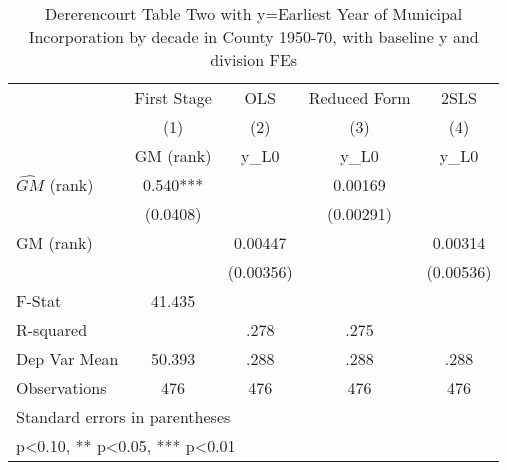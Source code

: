 \begin{table}[htbp]\centering
\def\sym#1{\ifmmode^{#1}\else\(^{#1}\)\fi}
\caption{Dererencourt Table Two with y=Earliest Year of Municipal Incorporation by decade in County 1950-70, with baseline y and division FEs}
\begin{tabular}{l*{4}{c}}
\toprule
                    & First Stage   &         OLS   &Reduced Form   &        2SLS   \\
                    &\multicolumn{1}{c}{(1)}&\multicolumn{1}{c}{(2)}&\multicolumn{1}{c}{(3)}&\multicolumn{1}{c}{(4)}\\
                    &\multicolumn{1}{c}{GM  (rank)}&\multicolumn{1}{c}{y\_L0}&\multicolumn{1}{c}{y\_L0}&\multicolumn{1}{c}{y\_L0}\\
\midrule
$\hat{GM}$ (rank)   &       0.540***&               &     0.00169   &               \\
                    &    (0.0408)   &               &   (0.00291)   &               \\
\addlinespace
GM  (rank)          &               &     0.00447   &               &     0.00314   \\
                    &               &   (0.00356)   &               &   (0.00536)   \\
\midrule
F-Stat              &      41.435   &               &               &               \\
R-squared           &               &        .278   &        .275   &               \\
Dep Var Mean        &      50.393   &        .288   &        .288   &        .288   \\
Observations        &         476   &         476   &         476   &         476   \\
\bottomrule
\multicolumn{5}{l}{\footnotesize Standard errors in parentheses}\\
\multicolumn{5}{l}{\footnotesize * p<0.10, ** p<0.05, *** p<0.01}\\
\end{tabular}
\end{table}
